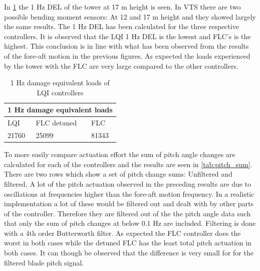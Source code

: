 \newpage

In \cref{tab:del} the 1 Hz DEL of the tower at 17 m height is seen. In VTS there are two possible bending moment sensors: At 12 and 17 m height and they showed largely the same results. The 1 Hz DEL has been calculated for the three respective controllers. It is observed that the LQI 1 Hz DEL is the lowest and FLC's is the highest. This conclusion is in line with what has been observed from the results of the fore-aft motion in the previous figures. As expected the loads experienced by the tower with the FLC are very large compared to the other controllers.

\begin{table}[t]
	\centering
	\caption{1 Hz damage equivalent loads of LQI controllers}
	\label{tab:del}
	\begin{tabular}{@{}|lll|@{}}
		\toprule
		\multicolumn{3}{|c|}{1 Hz damage equivalent loads}                                                                     \\ \midrule
		\multicolumn{1}{|l|}{LQI}                           & \multicolumn{1}{l|}{FLC detuned} & FLC                           \\ \midrule
		\multicolumn{1}{|l|}{\cellcolor[HTML]{9AFF99}21760} & \multicolumn{1}{l|}{25099}       & \cellcolor[HTML]{FFCCC9}81343 \\ \bottomrule
	\end{tabular}
\end{table}

To more easily compare actuation effort the sum of pitch angle changes are calculated for each of the controllers and the results are seen in \cref{tab:pitch_sum}. There are two rows which show a set of pitch change sums: Unfiltered and filtered. A lot of the pitch actuation observed in the preceding results are due to oscillations at frequencies higher than the fore-aft motion frequency. In a realistic implementation a lot of these would be filtered out and dealt with by other parts of the controller. Therefore they are filtered out of the the pitch angle data such that only the sum of pitch changes at below 0.1 Hz are included. Filtering is done with a 4th order Butterworth filter. As expected the FLC controller does the worst in both cases while the detuned FLC has the least total pitch actuation in both cases. It can though be observed that the difference is very small for for the filtered blade pitch signal.

